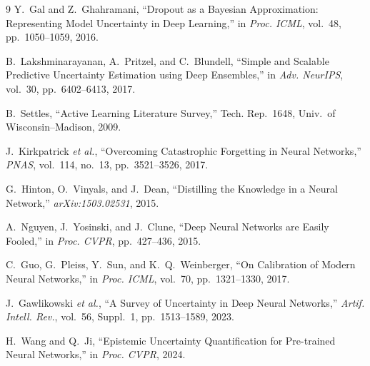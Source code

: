 \documentclass[conference]{IEEEtran}
\begin{document}
\begin{thebibliography}{9}
Y.~Gal and Z.~Ghahramani, ``Dropout as a {B}ayesian Approximation: Representing Model Uncertainty in Deep Learning,'' in \emph{Proc. ICML}, vol.~48, pp.~1050--1059, 2016.

B.~Lakshminarayanan, A.~Pritzel, and C.~Blundell, ``Simple and Scalable Predictive Uncertainty Estimation using Deep Ensembles,'' in \emph{Adv. NeurIPS}, vol.~30, pp.~6402--6413, 2017.

B.~Settles, ``Active Learning Literature Survey,'' Tech. Rep.~1648, Univ.\ of Wisconsin--Madison, 2009.

J.~Kirkpatrick \emph{et al.}, ``Overcoming Catastrophic Forgetting in Neural Networks,'' \emph{PNAS}, vol.~114, no.~13, pp.~3521--3526, 2017.

G.~Hinton, O.~Vinyals, and J.~Dean, ``Distilling the Knowledge in a Neural Network,'' \emph{arXiv:1503.02531}, 2015.

A.~Nguyen, J.~Yosinski, and J.~Clune, ``Deep Neural Networks are Easily Fooled,'' in \emph{Proc. CVPR}, pp.~427--436, 2015.

C.~Guo, G.~Pleiss, Y.~Sun, and K.~Q.~Weinberger, ``On Calibration of Modern Neural Networks,'' in \emph{Proc. ICML}, vol.~70, pp.~1321--1330, 2017.

J.~Gawlikowski \emph{et al.}, ``A Survey of Uncertainty in Deep Neural Networks,'' \emph{Artif. Intell. Rev.}, vol.~56, Suppl.~1, pp.~1513--1589, 2023.

H.~Wang and Q.~Ji, ``Epistemic Uncertainty Quantification for Pre-trained Neural Networks,'' in \emph{Proc. CVPR}, 2024.
\end{thebibliography}
\end{document}
